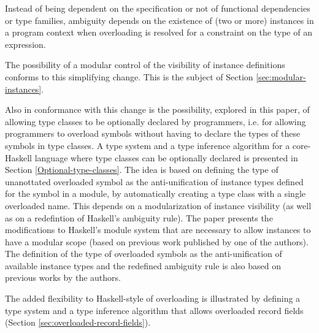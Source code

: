 Instead of being dependent on the specification or not of functional
dependencies or type families, ambiguity depends on the existence of
(two or more) instances in a program context when overloading is
resolved for a constraint on the type of an expression.

The possibility of a modular control of the visibility of instance
definitions conforms to this simplifying change. This is the subject
of Section \ref{sec:modular-instances}.

Also in conformance with this change is the possibility, explored in
this paper, of allowing type classes to be optionally declared by
programmers, i.e. for allowing programmers to overload symbols without
having to declare the types of these symbols in type classes. A type
system and a type inference algorithm for a core-Haskell language
where type classes can be optionally declared is presented in Section
\ref{Optional-type-classes}.  The idea is based on defining the type
of unanottated overloaded symbol as the anti-unification of instance
types defined for the symbol in a module, by automatically creating a
type class with a single overloaded name. This depends on a
modularization of instance visibility (as well as on a redefintion of
Haskell's ambiguity rule).  The paper presents the modifications to
Haskell's module system that are necessary to allow instances to have
a modular scope (based on previous work published by one of the
authors). The definition of the type of overloaded symbols as the
anti-unification of available instance types and the redefined
ambiguity rule is also based on previous works by the authors.

The added flexibility to Haskell-style of overloading is illustrated
by defining a type system and a type inference algorithm that allows
overloaded record fields (Section \ref{sec:overloaded-record-fields}).


